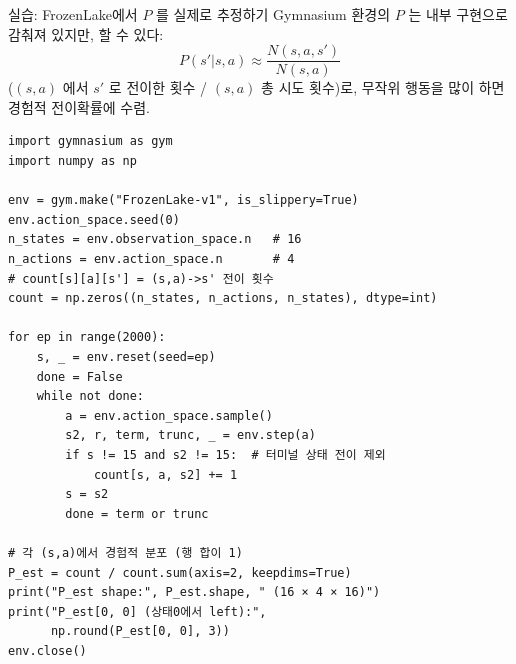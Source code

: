 \documentclass[aspectratio=169,11pt]{beamer}
\begin{document}

\begin{frame}[fragile]{실습: FrozenLake에서 $P$ 를 실제로 추정하기}
  Gymnasium 환경의 $P$ 는 내부 구현으로 감춰져 있지만,
  할 수 있다:
  \[
  P(s'|s,a) \approx \frac{N(s,a,s')}{N(s,a)}
  \]
  ($(s,a)$ 에서 $s'$ 로 전이한 횟수 / $(s,a)$ 총 시도 횟수)로,
  무작위 행동을 많이 하면 경험적 전이확률에 수렴.
  \begin{lstlisting}
import gymnasium as gym
import numpy as np

env = gym.make("FrozenLake-v1", is_slippery=True)
env.action_space.seed(0)
n_states = env.observation_space.n   # 16
n_actions = env.action_space.n       # 4
# count[s][a][s'] = (s,a)->s' 전이 횟수
count = np.zeros((n_states, n_actions, n_states), dtype=int)

for ep in range(2000):
    s, _ = env.reset(seed=ep)
    done = False
    while not done:
        a = env.action_space.sample()
        s2, r, term, trunc, _ = env.step(a)
        if s != 15 and s2 != 15:  # 터미널 상태 전이 제외
            count[s, a, s2] += 1
        s = s2
        done = term or trunc

# 각 (s,a)에서 경험적 분포 (행 합이 1)
P_est = count / count.sum(axis=2, keepdims=True)
print("P_est shape:", P_est.shape, " (16 × 4 × 16)")
print("P_est[0, 0] (상태0에서 left):",
      np.round(P_est[0, 0], 3))
env.close()
  \end{lstlisting}
\end{frame}
\end{document}
